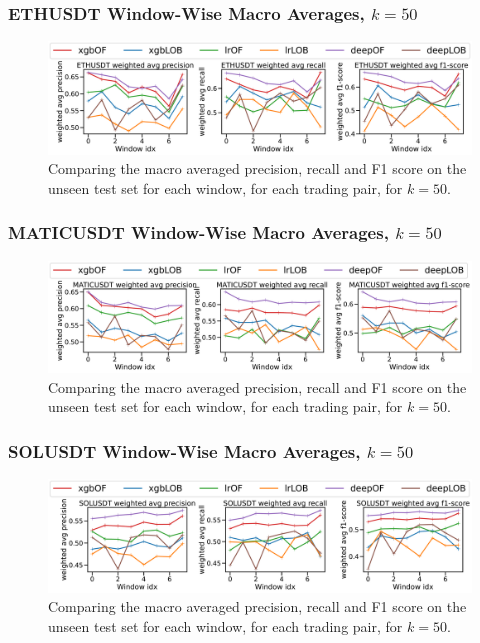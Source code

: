 \documentclass[handout]{beamer}
\begin{document}
\begin{frame}
    \frametitle{ETHUSDT Window-Wise Macro Averages, $k=50$}
    \begin{figure}[htpb!]
        \centering
        \includegraphics[width=1.0\textwidth]{./images/ETHUSDT_macro_results_k=50.pdf}
        \caption{Comparing the macro averaged precision, recall and F1 score on the unseen test set for each window, for each trading pair, for $k=50$.}
        
    \end{figure}
\end{frame}

\begin{frame}
    \frametitle{MATICUSDT Window-Wise Macro Averages, $k=50$}
    \begin{figure}[htpb!]
        \centering
        \includegraphics[width=1.0\textwidth]{./images/MATICUSDT_macro_results_k=50.pdf}
        \caption{Comparing the macro averaged precision, recall and F1 score on the unseen test set for each window, for each trading pair, for $k=50$.}
        
    \end{figure}
\end{frame}

\begin{frame}
    \frametitle{SOLUSDT Window-Wise Macro Averages, $k=50$}
    \begin{figure}[htpb!]
        \centering
        \includegraphics[width=1.0\textwidth]{./images/SOLUSDT_macro_results_k=50.pdf}
        \caption{Comparing the macro averaged precision, recall and F1 score on the unseen test set for each window, for each trading pair, for $k=50$.}
        
    \end{figure}
\end{frame}
\end{document}
